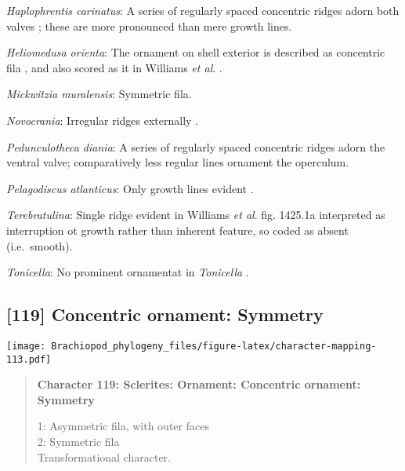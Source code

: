 \documentclass[openany]{book}
\theoremstyle{definition}
\theoremstyle{definition}
\theoremstyle{definition}
\theoremstyle{remark}
\begin{document}
\hypertarget{Haplophrentis_carinatus-coding-118}{}
\emph{Haplophrentis carinatus}: A series of regularly spaced concentric
ridges adorn both valves \citep{Moysiuk2017Hyolithsare}; these are more
pronounced than mere growth lines.

\hypertarget{Heliomedusa_orienta-coding-118}{}
\emph{Heliomedusa orienta}: The ornament on shell exterior is described
as concentric fila \citep[P.43]{Chen2007Reinterpretationof}, and also
scored as it in Williams \emph{et al}.
\citeyearpar[pp.160--163]{Williams2000LinguliformeaCraniiformea}.

\hypertarget{Mickwitzia_muralensis-coding-118}{}
\emph{Mickwitzia muralensis}: Symmetric fila.

\hypertarget{Novocrania-coding-118}{}
\emph{Novocrania}: Irregular ridges externally
\citep{Williams2000LinguliformeaCraniiformea}.

\hypertarget{Pedunculotheca_diania-coding-118}{}
\emph{Pedunculotheca diania}: A series of regularly spaced concentric
ridges adorn the ventral valve; comparatively less regular lines
ornament the operculum.

\hypertarget{Pelagodiscus_atlanticus-coding-118}{}
\emph{Pelagodiscus atlanticus}: Only growth lines evident
\citep{Williams2000LinguliformeaCraniiformea}.

\hypertarget{Terebratulina-coding-118}{}
\emph{Terebratulina}: Single ridge evident in Williams \emph{et al}.
\citeyearpar{Williams2006Rhynchonelliformeapart} fig. 1425.1a
interpreted as interruption ot growth rather than inherent feature, so
coded as absent (i.e.~smooth).

\hypertarget{Tonicella-coding-118}{}
\emph{Tonicella}: No prominent ornamentat in \emph{Tonicella}
\citep{Connors2012}.

\subsection*{{[}119{]} Concentric ornament:
Symmetry}\label{concentric-ornament-symmetry}

\texttt{[image: Brachiopod\_phylogeny\_files/figure-latex/character-mapping-113.pdf]}

\begin{quote}
\textbf{Character 119: Sclerites: Ornament: Concentric ornament:
Symmetry}

1: Asymmetric fila, with outer faces\\
2: Symmetric fila\\
Transformational character.
\end{quote}
\end{document}
